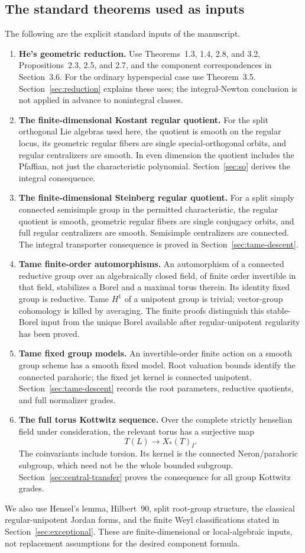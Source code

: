 \documentclass[11pt,a4paper]{article}
\theoremstyle{definition}
\theoremstyle{remark}
\begin{document}
\subsection{The standard theorems used as inputs}
The following are the explicit standard inputs of the manuscript.
\begin{enumerate}[label=\textbf{\Alph*.}]
\item \textbf{He's geometric reduction.}
Use Theorems~1.3, 1.4, 2.8, and 3.2, Propositions~2.3, 2.5, and
2.7, and the component correspondences in Section~3.6. For the
ordinary hyperspecial case use Theorem~3.5.
Section~\ref{sec:reduction} explains these uses; the integral-Newton
conclusion is not applied in advance to nonintegral classes.
\item \textbf{The finite-dimensional Kostant regular quotient.}
For the split orthogonal Lie algebras used here, the quotient is
smooth on the regular locus, its geometric regular fibers are
single special-orthogonal orbits, and regular centralizers are
smooth. In even dimension the quotient includes the Pfaffian, not
just the characteristic polynomial.
Section~\ref{sec:so} derives the integral consequence.
\item \textbf{The finite-dimensional Steinberg regular quotient.}
For a split simply connected semisimple group in the permitted
characteristic, the regular quotient is smooth, geometric regular
fibers are single conjugacy orbits, and full regular centralizers
are smooth. Semisimple centralizers are connected.
The integral transporter consequence is proved in
Section~\ref{sec:tame-descent}.
\item \textbf{Tame finite-order automorphisms.}
An automorphism of a connected reductive group over an algebraically
closed field, of finite order invertible in that field, stabilizes
a Borel and a maximal torus therein. Its identity fixed group is
reductive. Tame \(H^1\) of a unipotent group is trivial; vector-group
cohomology is killed by averaging. The finite proofs distinguish
this stable-Borel input from the unique Borel available after
regular-unipotent regularity has been proved.
\item \textbf{Tame fixed group models.}
An invertible-order finite action on a smooth group scheme has a
smooth fixed model. Root valuation bounds identify the connected
parahoric; the fixed jet kernel is connected unipotent.
Section~\ref{sec:tame-descent} records the root parameters,
reductive quotients, and full normalizer grades.
\item \textbf{The full torus Kottwitz sequence.}
Over the complete strictly henselian field under consideration,
the relevant torus has a surjective map
\[
T(L)\longrightarrow X_*(T)_I.
\]
The coinvariants include torsion. Its kernel is the connected
Neron/parahoric subgroup, which need not be the whole bounded
subgroup. Section~\ref{sec:central-transfer} proves the consequence
for all group Kottwitz grades.
\end{enumerate}
We also use Hensel's lemma, Hilbert~90, split root-group structure,
the classical regular-unipotent Jordan forms, and the finite Weyl
classifications stated in Section~\ref{sec:exceptional}. These are
finite-dimensional or local-algebraic inputs, not replacement
assumptions for the desired component formula.
\end{document}
